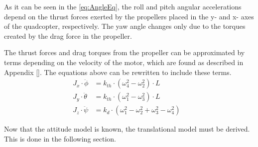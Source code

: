 \begin{where}
\end{where}

As it can be seen in the \autoref{eq:AngleEq}, the roll and pitch angular accelerations depend on the thrust forces exerted by the propellers placed in the y- and x- axes of the quadcopter, respectively. The yaw angle changes only due to the torques created by the drag force in the propeller.

The thrust forces and drag torques from the propeller can be approximated by terms depending on the velocity of the motor, which are found as described in Appendix \ref{}. The equations above can be rewritten to include these terms.
%
\begin{align}
J_x\cdot\ddot{\phi}&=k_{th} \cdot(\omega^2_4-\omega^2_2) \cdot L &\\
J_y \cdot\ddot{\theta}&=k_{th} \cdot(\omega^2_1-\omega^2_3) \cdot L &\\
J_z\cdot\ddot{\psi}&=k_d \cdot(\omega^2_1-\omega^2_2+\omega^2_3-\omega^2_4)
\label{eq:AngleEqVelocities}
\end{align}

\begin{where}
\end{where}

Now that the attitude model is known, the translational model must be derived. This is done in the following section. 